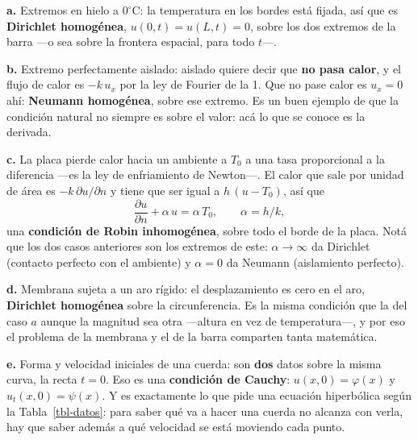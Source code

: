 \documentclass[
  spanish,
  a4paper,
]{scrbook}
\theoremstyle{definition}
\theoremstyle{plain}
\theoremstyle{definition}
\theoremstyle{plain}
\theoremstyle{definition}
\theoremstyle{remark}
\begin{document}
\begin{tcolorbox}[enhanced jigsaw, arc=.35mm, bottomrule=.15mm, bottomtitle=1mm, breakable, colback=white, colbacktitle=quarto-callout-tip-color!10!white, colframe=quarto-callout-tip-color-frame, coltitle=black, left=2mm, leftrule=.75mm, opacityback=0, opacitybacktitle=0.6, rightrule=.15mm, title=\textcolor{quarto-callout-tip-color}{\faLightbulb}\hspace{0.5em}{Solución}, titlerule=0mm, toprule=.15mm, toptitle=1mm]

\textbf{a.} Extremos en hielo a \(0^\circ\)C: la temperatura en los
bordes está fijada, así que es \textbf{Dirichlet homogénea},
\(u(0,t) = u(L,t) = 0\), sobre los dos extremos de la barra ---o sea
sobre la frontera espacial, para todo \(t\)---.

\textbf{b.} Extremo perfectamente aislado: aislado quiere decir que
\textbf{no pasa calor}, y el flujo de calor es \(-k\,u_x\) por la ley de
Fourier de la 1. Que no pase calor es \(u_x = 0\) ahí: \textbf{Neumann
homogénea}, sobre ese extremo. Es un buen ejemplo de que la condición
natural no siempre es sobre el valor: acá lo que se conoce es la
derivada.

\textbf{c.} La placa pierde calor hacia un ambiente a \(T_0\) a una tasa
proporcional a la diferencia ---es la ley de enfriamiento de Newton---.
El calor que sale por unidad de área es \(-k\,\partial u/\partial n\) y
tiene que ser igual a \(h\,(u - T_0)\), así que
\[\frac{\partial u}{\partial n} + \alpha\,u = \alpha\,T_0, \qquad \alpha = h/k,\]
una \textbf{condición de Robin inhomogénea}, sobre todo el borde de la
placa. Notá que los dos casos anteriores son los extremos de este:
\(\alpha \to \infty\) da Dirichlet (contacto perfecto con el ambiente) y
\(\alpha = 0\) da Neumann (aislamiento perfecto).

\textbf{d.} Membrana sujeta a un aro rígido: el desplazamiento es cero
en el aro, \textbf{Dirichlet homogénea} sobre la circunferencia. Es la
misma condición que la del caso \(a\) aunque la magnitud sea otra
---altura en vez de temperatura---, y por eso el problema de la membrana
y el de la barra comparten tanta matemática.

\textbf{e.} Forma y velocidad iniciales de una cuerda: son \textbf{dos}
datos sobre la misma curva, la recta \(t=0\). Eso es una
\textbf{condición de Cauchy}: \(u(x,0) = \varphi(x)\) y
\(u_t(x,0) = \psi(x)\). Y es exactamente lo que pide una ecuación
hiperbólica según la Tabla~\ref{tbl-datos}: para saber qué va a hacer
una cuerda no alcanza con verla, hay que saber además a qué velocidad se
está moviendo cada punto.

\end{tcolorbox}
\end{document}
